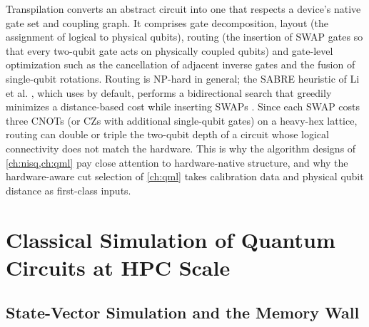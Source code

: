 Transpilation converts an abstract circuit into one that respects a device's native gate set and coupling graph. It comprises gate decomposition, layout (the assignment of logical to physical qubits), routing (the insertion of SWAP gates so that every two-qubit gate acts on physically coupled qubits) and gate-level optimization such as the cancellation of adjacent inverse gates and the fusion of single-qubit rotations. Routing is NP-hard in general; the SABRE heuristic of Li et al. \cite{li2019sabre}, which \qiskit{} uses by default, performs a bidirectional search that greedily minimizes a distance-based cost while inserting SWAPs \cite{javadiabhari2024qiskit}. Since each SWAP costs three CNOTs (or CZs with additional single-qubit gates) on a heavy-hex lattice, routing can double or triple the two-qubit depth of a circuit whose logical connectivity does not match the hardware. This is why the algorithm designs of \cref{ch:nisq,ch:qml} pay close attention to hardware-native structure, and why the hardware-aware cut selection of \cref{ch:qml} takes calibration data and physical qubit distance as first-class inputs.

\section{Classical Simulation of Quantum Circuits at HPC Scale}\label{sec:bg:sim}

\subsection{State-Vector Simulation and the Memory Wall}

